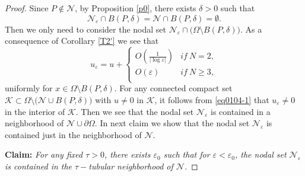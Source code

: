 \documentclass[11pt,reqno]{article}
\numberwithin{equation}{section}
\newcommand\e\varepsilon
\renewcommand\O\Omega
\begin{document}
   \begin{proof}
       Since $P\notin \mathcal{N}$,  by Proposition \ref{p0}, there exists $\delta>0$ such that 
       $$
       \mathcal{N}_\e\cap B(P,\delta)=\mathcal{N}\cap B(P,\delta)=\emptyset.
       $$
       Then we only need to consider the nodal set $\mathcal{N}_\e \cap \big(\O\setminus B(P,\delta)\big)$.
      As a consequence of Corollary \ref{T2'}  we see that 
    \begin{equation}\label{eq0104-1}
        u_\e=u+\begin{cases}
            O\left(\frac{1}{|\log\e|}\right) &if \ N=2,\\
            O(\e)&if\ N\ge3,\\
        \end{cases}
    \end{equation}
    uniformly  for $x\in \O\setminus B(P,\delta)$.
    For any connected compact set $\mathcal{K}\subset \O\setminus \big(\mathcal{N}\cup B(P,\delta)\big)$  with $u\neq 0$ in $\mathcal{K}$, it follows from \eqref{eq0104-1} that $u_\e \neq 0$ in  the interior of $\mathcal{K}$. Then we see that the nodal set $\mathcal{N}_\e$ is  contained in a neighborhood of   $\mathcal{N}\cup \partial\O$. 
     In next claim we show that the nodal set $\mathcal{N}_\e$ is  contained just in the neighborhood of $\mathcal{N}$.
    
\textbf{Claim:} \emph{For any fixed $\tau>0$, there exists $\e_0$ such that for $\e<\e_0$, the nodal set $\mathcal{N}_\e$ is contained in the $\tau-$tubular neighborhood of $\mathcal{N}$.}
    

\end{proof}
\end{document}
